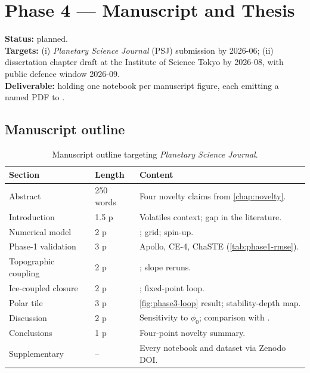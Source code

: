 \chapter{Phase 4 --- Manuscript and Thesis}
\label{chap:phase4}

\begin{milestone}
\textbf{Status:} planned.\\
\textbf{Targets:} (i) \emph{Planetary Science Journal} (PSJ) submission
by 2026-06; (ii) dissertation chapter draft at the Institute of
Science Tokyo by 2026-08, with public defence window 2026-09.\\
\textbf{Deliverable:}  holding one
notebook per manuscript figure, each emitting a named PDF to
.
\end{milestone}

\section{Manuscript outline}

\begin{table}[H]
\centering
\small
\begin{tabularx}{\linewidth}{l l Y}
\toprule
Section & Length & Content \\
\midrule
Abstract        & 250 words  & Four novelty claims from \cref{chap:novelty}. \\
Introduction    & 1.5 p      & Volatiles context; gap in the literature. \\
Numerical model & 2 p        & ; grid; spin-up. \\
Phase-1 validation & 3 p      & Apollo, CE-4, ChaSTE (\cref{tab:phase1-rmse}). \\
Topographic coupling & 2 p    & ; slope reruns. \\
Ice-coupled closure  & 2 p    & ; fixed-point loop. \\
Polar tile          & 3 p     & \cref{fig:phase3-loop} result; stability-depth map. \\
Discussion          & 2 p     & Sensitivity to $\phi_0$; comparison with \citet{paige2010}. \\
Conclusions         & 1 p     & Four-point novelty summary. \\
Supplementary       & --      & Every notebook and dataset via Zenodo DOI. \\
\bottomrule
\end{tabularx}
\caption{Manuscript outline targeting \emph{Planetary Science Journal}.}
\label{tab:psj-outline}
\end{table}

